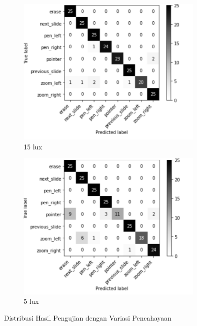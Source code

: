 \begin{figure}[!htb]
\begin{subfigure}{0.48\textwidth}
  \end{subfigure}
  \quad
  \hfill
  \begin{subfigure}{0.49\textwidth}
    \centering
    \includegraphics[width=\linewidth]{gambar/pengujian-cahaya/15lux.png}
    \caption{15 lux}
    \label{fig:Distribusi Hasil Pengujian dengan Variasi Pencahayaan 15 lux}
  \end{subfigure}
  \hfill
  \quad
  \begin{subfigure}{0.47\textwidth}
    \centering
    \includegraphics[width=\linewidth]{gambar/pengujian-cahaya/5lux.png}
    \caption{5 lux}
    \label{fig:Distribusi Hasil Pengujian dengan Variasi Pencahayaan 5 lux}
  \end{subfigure}
  \caption{Distribusi Hasil Pengujian dengan Variasi Pencahayaan}
  \label{fig:Distribusi Hasil Pengujian dengan Variasi Pencahayaan}
\end{figure}

